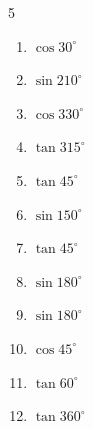 \begin{multicols}{5}
\begin{enumerate}
        \phantom{$\displaystyle =0$}

  \item $\displaystyle \cos{30^\circ}$


\columnbreak %

\resetques

  \item $\displaystyle \sin{210^\circ}$


  \item $\displaystyle \cos{330^\circ}$


  \item $\displaystyle \tan{315^\circ}$

        \phantom{$\displaystyle =-1$}

  \item $\displaystyle \tan{45^\circ}$

        \phantom{$\displaystyle =1$}

  \item $\displaystyle \sin{150^\circ}$


  \item $\displaystyle \tan{45^\circ}$

        \phantom{$\displaystyle =1$}

  \item $\displaystyle \sin{180^\circ}$

        \phantom{$\displaystyle =0$}

  \item $\displaystyle \sin{180^\circ}$

        \phantom{$\displaystyle =0$}

  \item $\displaystyle \cos{45^\circ}$


  \item $\displaystyle \tan{60^\circ}$


  \item $\displaystyle \tan{360^\circ}$

        \phantom{$\displaystyle =0$}


\end{enumerate}
\end{multicols}
